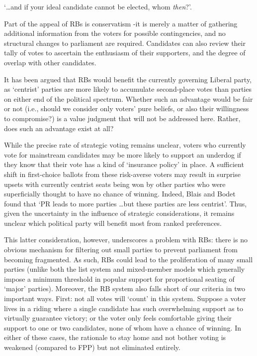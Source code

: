 \begin{tcolorbox}[colback=white!5!white,colframe=blue!55!black]
`\ldots and if your ideal candidate cannot be elected, whom \emph{then}?'.
\end{tcolorbox}

Part of the appeal of RBs is conservatism \--it is merely a matter of gathering additional information from the voters for possible contingencies, and no structural changes to parliament are required. Candidates can also review their tally of votes to ascertain the enthusiasm of their supporters, and the degree of overlap with other candidates.

It has been argued\cite{Record} that RBs would benefit the currently governing Liberal party, as `centrist' parties are more likely to accumulate second-place votes than parties on either end of the political spectrum.
Whether such an advantage would be fair or not (i.e., should we consider only voters' pure beliefs, or also their willingness to compromise?) is a value judgment that will not be addressed here. Rather, does such an advantage exist at all?

While the precise rate of strategic voting remains unclear, voters who currently vote for mainstream candidates may be more likely to support an underdog if they know that their vote has a kind of `insurance policy' in place.
A sufficient shift in first-choice ballots from these risk-averse voters may result in surprise upsets with currently centrist seats being won by other parties who were superficially thought to have no chance of winning. Indeed, Blais and Bodet found that `PR  leads to more parties \ldots but these parties are less centrist'\cite{Blais_2006}.
Thus, given the uncertainty in the influence of strategic considerations, it remains  unclear which political party will benefit most from ranked preferences.

This latter consideration, however, underscores a problem with RBs:  there is no obvious mechanism for filtering out small parties to prevent parliament from becoming fragmented. As such, RBs could lead to the proliferation of many small parties
(unlike both the list system and  mixed-member models which generally impose a minimum threshold in popular support for proportional seating of `major' parties).
Moreover, the RB system also falls short of our criteria in two important ways.
First: not all votes will `count' in this system.
Suppose a voter lives in a riding where a single candidate has such overwhelming support as to virtually guarantee victory; or the voter only feels comfortable giving their support to one or two candidates, none of whom have a chance of winning.
In either of these cases, the rationale to stay home and not bother voting is weakened (compared to FPP) but not eliminated entirely.


